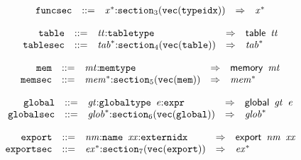 \vspace{1ex}

$$
\begin{array}{@{}l@{}rrlll@{}l@{}}
& {\mathtt{funcsec}} &::=& {{\mathit{x}}^\ast}{:}{{\mathtt{section}}}_{3}({\mathtt{vec}}({\mathtt{typeidx}})) &\Rightarrow& {{\mathit{x}}^\ast} \\
\end{array}
$$

\vspace{1ex}

$$
\begin{array}{@{}l@{}rrlll@{}l@{}}
& {\mathtt{table}} &::=& {\mathit{tt}}{:}{\mathtt{tabletype}} &\Rightarrow& \mathsf{table}~\,{\mathit{tt}} \\
& {\mathtt{tablesec}} &::=& {{\mathit{tab}}^\ast}{:}{{\mathtt{section}}}_{4}({\mathtt{vec}}({\mathtt{table}})) &\Rightarrow& {{\mathit{tab}}^\ast} \\
\end{array}
$$

\vspace{1ex}

$$
\begin{array}{@{}l@{}rrlll@{}l@{}}
& {\mathtt{mem}} &::=& {\mathit{mt}}{:}{\mathtt{memtype}} &\Rightarrow& \mathsf{memory}~\,{\mathit{mt}} \\
& {\mathtt{memsec}} &::=& {{\mathit{mem}}^\ast}{:}{{\mathtt{section}}}_{5}({\mathtt{vec}}({\mathtt{mem}})) &\Rightarrow& {{\mathit{mem}}^\ast} \\
\end{array}
$$

\vspace{1ex}

$$
\begin{array}{@{}l@{}rrlll@{}l@{}}
& {\mathtt{global}} &::=& {\mathit{gt}}{:}{\mathtt{globaltype}}~\,{\mathit{e}}{:}{\mathtt{expr}} &\Rightarrow& \mathsf{global}~\,{\mathit{gt}}~\,{\mathit{e}} \\
& {\mathtt{globalsec}} &::=& {{\mathit{glob}}^\ast}{:}{{\mathtt{section}}}_{6}({\mathtt{vec}}({\mathtt{global}})) &\Rightarrow& {{\mathit{glob}}^\ast} \\
\end{array}
$$

\vspace{1ex}

$$
\begin{array}{@{}l@{}rrlll@{}l@{}}
& {\mathtt{export}} &::=& {\mathit{nm}}{:}{\mathtt{name}}~\,{\mathit{xx}}{:}{\mathtt{externidx}} &\Rightarrow& \mathsf{export}~\,{\mathit{nm}}~\,{\mathit{xx}} \\
& {\mathtt{exportsec}} &::=& {{\mathit{ex}}^\ast}{:}{{\mathtt{section}}}_{7}({\mathtt{vec}}({\mathtt{export}})) &\Rightarrow& {{\mathit{ex}}^\ast} \\
\end{array}
$$

